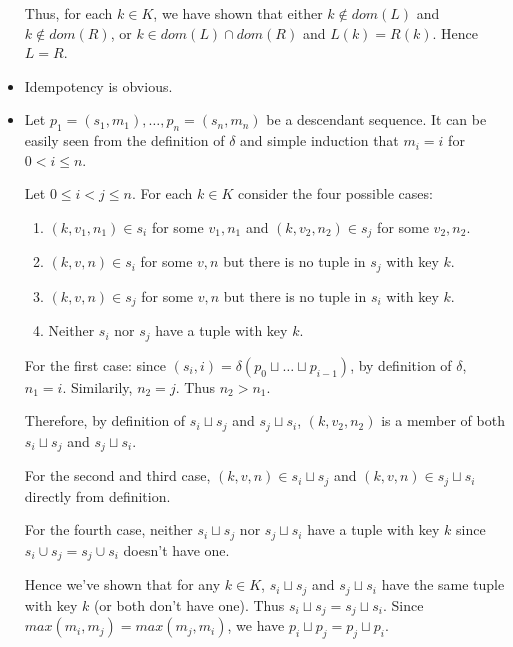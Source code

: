 \documentclass[12pt,a4paper,en]{pracamgr}
\begin{document}
\begin{ex}
\begin{itemize}
            Thus, for each $k \in K$, we have shown that either $k \notin dom(L)$ and $k \notin dom(R)$, or $k \in dom(L) \cap dom(R)$ and $L(k) = R(k)$. Hence $L = R$.

		\item Idempotency is obvious.
        \item Let $p_1 = (s_1, m_1), \dots, p_n = (s_n, m_n)$ be a descendant sequence. It can be easily seen from the definition of $\delta$ and simple induction that $m_i = i$ for $0 < i \le n$.

            Let $0 \le i < j \le n$. For each $k \in K$ consider the four possible cases:
			\begin{enumerate}
				\item $(k, v_1, n_1) \in s_i$ for some $v_1, n_1$ and $(k, v_2, n_2) \in s_j$ for some $v_2, n_2$.
				\item $(k, v, n) \in s_i$ for some $v, n$ but there is no tuple in $s_j$ with key $k$.
				\item $(k, v, n) \in s_j$ for some $v, n$ but there is no tuple in $s_i$ with key $k$.
				\item Neither $s_i$ nor $s_j$ have a tuple with key $k$.
			\end{enumerate}

            For the first case: since $(s_i, i) = \delta(p_0 \sqcup \dots \sqcup p_{i-1})$, by definition of $\delta$, $n_1 = i$. Similarily, $n_2 = j$. Thus $n_2 > n_1$.

            Therefore, by definition of $s_i \sqcup s_j$ and $s_j \sqcup s_i$, $ (k, v_2, n_2)$ is a member of both $s_i \sqcup s_j$ and $s_j \sqcup s_i$.

			For the second and third case, $(k,v,n) \in s_i \sqcup s_j$ and $(k, v, n) \in s_j \sqcup s_i$ directly from definition.

			For the fourth case, neither $s_i \sqcup s_j$ nor $s_j \sqcup s_i$ have a tuple with key $k$ since $s_i \cup s_j = s_j \cup s_i$ doesn't have one.

            Hence we've shown that for any $k \in K$, $s_i \sqcup s_j$ and $s_j \sqcup s_i$ have the same tuple with key $k$ (or both don't have one). Thus $s_i \sqcup s_j = s_j \sqcup s_i$. Since $max(m_i, m_j) = max(m_j, m_i)$, we have $p_i \sqcup p_j = p_j \sqcup p_i$.
	\end{itemize}


\end{ex}
\end{document}
